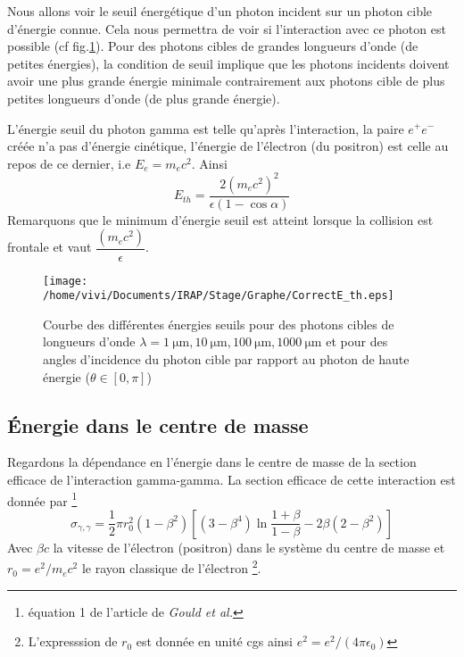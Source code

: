 \documentclass[a4paper,12pt,twoside]{article}
\begin{document}
Nous allons voir le seuil énergétique d'un photon incident sur un photon cible d'énergie connue. Cela nous permettra de voir si l'interaction avec ce photon est possible (cf fig.\ref{fig: Eth}). Pour des photons cibles de grandes longueurs d'onde (de petites énergies),  la condition de seuil implique que les photons incidents doivent avoir une plus grande énergie minimale contrairement aux photons cible de plus petites longueurs d'onde (de plus grande énergie).

L'énergie seuil du photon gamma est telle qu'après l'interaction, la paire $e^+ e^-$ créée n'a pas d'énergie cinétique, l'énergie de l'électron (du positron) est celle au repos de ce dernier, i.e $E_e = m_e c^2$. Ainsi
\begin{equation}
	E_{th} = \frac{2 (m_e c^2)^2}{\epsilon (1 - \cos\alpha)}
\end{equation}
Remarquons que le minimum d'énergie seuil est atteint lorsque la collision est frontale et vaut $\dfrac{(m_e c^2)}{\epsilon}$.

\begin{figure}[H]
	\centering
    \texttt{[image: /home/vivi/Documents/IRAP/Stage/Graphe/CorrectE\_th.eps]}
    \caption{Courbe des différentes énergies seuils pour des photons cibles de longueurs d'onde 
    $\lambda = \SI{1}{\micro\m}, \SI{10}{\micro\m}, \SI{100}{\micro\m}, \SI{1000}{\micro\m}$ et pour des angles d'incidence du photon cible par rapport au photon de haute énergie ($\theta \in [0, \pi]$)}
    \label{fig: Eth}
\end{figure}

\subsection{Énergie dans le centre de masse}\label{sec: CM}

Regardons la dépendance en l'énergie dans le centre de masse de la section efficace de l'interaction gamma-gamma. La section efficace de cette interaction est donnée par \footnote{équation 1 de l'article de \emph{Gould et al.}}
\begin{equation}
	\sigma_{\gamma, \gamma} = \frac{1}{2}\pi r_0^2 (1 - \beta^2) \left[(3 - \beta^4) \ln \frac{1 + \beta}{1 - \beta} - 2 \beta (2 - \beta^2) \right]
    \label{eq: cross section}
\end{equation}
Avec $\beta c$ la vitesse de l'électron (positron) dans le système du centre de masse et $r_0 = e^2/m_e c^2$ le rayon classique de l'électron \footnote{L'expresssion de $r_0$ est donnée en unité cgs ainsi $e^2 = e^2/(4 \pi \epsilon_0)$}.
\end{document}
